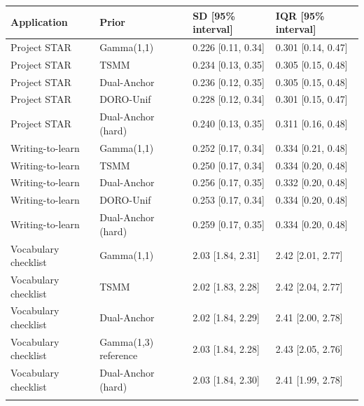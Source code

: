 \begin{longtable}{llll}
\toprule
Application & Prior & SD [95\% interval] & IQR [95\% interval] \\
\midrule\endhead
Project STAR & Gamma(1,1) & 0.226 [0.11, 0.34] & 0.301 [0.14, 0.47] \\ \addlinespace[3pt]
Project STAR & TSMM & 0.234 [0.13, 0.35] & 0.305 [0.15, 0.48] \\ \addlinespace[3pt]
Project STAR & Dual-Anchor & 0.236 [0.12, 0.35] & 0.305 [0.15, 0.48] \\ \addlinespace[3pt]
Project STAR & DORO-Unif & 0.228 [0.12, 0.34] & 0.301 [0.15, 0.47] \\ \addlinespace[3pt]
Project STAR & Dual-Anchor (hard) & 0.240 [0.13, 0.35] & 0.311 [0.16, 0.48] \\ \addlinespace[3pt]
Writing-to-learn & Gamma(1,1) & 0.252 [0.17, 0.34] & 0.334 [0.21, 0.48] \\ \addlinespace[3pt]
Writing-to-learn & TSMM & 0.250 [0.17, 0.34] & 0.334 [0.20, 0.48] \\ \addlinespace[3pt]
Writing-to-learn & Dual-Anchor & 0.256 [0.17, 0.35] & 0.332 [0.20, 0.48] \\ \addlinespace[3pt]
Writing-to-learn & DORO-Unif & 0.253 [0.17, 0.34] & 0.334 [0.20, 0.48] \\ \addlinespace[3pt]
Writing-to-learn & Dual-Anchor (hard) & 0.259 [0.17, 0.35] & 0.334 [0.20, 0.48] \\ \addlinespace[3pt]
Vocabulary checklist & Gamma(1,1) & 2.03 [1.84, 2.31] & 2.42 [2.01, 2.77] \\ \addlinespace[3pt]
Vocabulary checklist & TSMM & 2.02 [1.83, 2.28] & 2.42 [2.04, 2.77] \\ \addlinespace[3pt]
Vocabulary checklist & Dual-Anchor & 2.02 [1.84, 2.29] & 2.41 [2.00, 2.78] \\ \addlinespace[3pt]
Vocabulary checklist & Gamma(1,3) reference & 2.03 [1.84, 2.28] & 2.43 [2.05, 2.76] \\ \addlinespace[3pt]
Vocabulary checklist & Dual-Anchor (hard) & 2.03 [1.84, 2.30] & 2.41 [1.99, 2.78] \\ \addlinespace[3pt]
\bottomrule\end{longtable}
